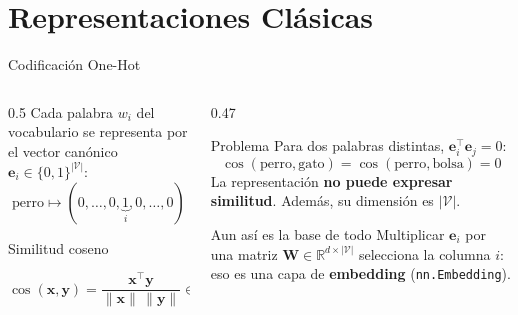 \documentclass[aspectratio=169, 10pt]{beamer}
\providecommand{\R}{\mathbb{R}}
\newcommand{\V}{\mathcal{V}}
\newcommand{\formula}[1]{%
	\begin{tcolorbox}[colback=UCMBlue!8, colframe=UCMBlue, arc=4pt,
		boxsep=2pt, left=6pt, right=6pt, top=3pt, bottom=3pt]
		#1
	\end{tcolorbox}
}
\begin{document}
\section{Representaciones Cl\'asicas}

\begin{frame}{Codificaci\'on One-Hot}

	\begin{columns}[T]
		\begin{column}{0.5\textwidth}
			Cada palabra $w_i$ del vocabulario se representa por el vector can\'onico $\mathbf{e}_i \in \{0,1\}^{|\V|}$:
			\[
				\text{perro} \mapsto (0,\dots,0,\underbrace{1}_{i},0,\dots,0)
			\]

			\begin{block}{Similitud coseno}
				\formula{\centering $\cos(\mathbf{x},\mathbf{y}) = \dfrac{\mathbf{x}^\top\mathbf{y}}{\|\mathbf{x}\|\,\|\mathbf{y}\|} \in [-1,1]$}
			\end{block}
		\end{column}

		\begin{column}{0.47\textwidth}
			\begin{alertblock}{Problema}
				\small
				Para dos palabras distintas, $\mathbf{e}_i^\top \mathbf{e}_j = 0$:
				\[
					\cos(\text{perro},\text{gato}) = \cos(\text{perro},\text{bolsa}) = 0
				\]
				La representaci\'on \textbf{no puede expresar similitud}. Adem\'as, su dimensi\'on es $|\V|$.
			\end{alertblock}

			\vspace{0.2cm}

			\begin{block}{Aun as\'i es la base de todo}
				\small
				Multiplicar $\mathbf{e}_i$ por una matriz $\mathbf{W}\in\R^{d\times|\V|}$ selecciona la columna $i$: eso es una capa de \textbf{embedding} (\texttt{nn.Embedding}).
			\end{block}
		\end{column}
	\end{columns}

\end{frame}
\end{document}
